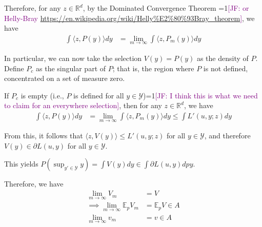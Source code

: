 \documentclass{article}
\newcommand{\Comments}{1}
\newcommand{\mynote}[2]{\ifnum\Comments=1\textcolor{#1}{#2}\fi}
\newcommand{\jessie}[1]{\mynote{purple}{[JF: #1]}}
\newcommand{\reals}{\mathbb{R}}
\newcommand{\E}{\mathbb{E}}
\newcommand{\Y}{\mathcal{Y}}
\newcommand{\inprod}[2]{\langle #1, #2 \rangle}%
\begin{document}
Therefore, for any $z \in \reals^d$, by the Dominated Convergence Theorem \jessie{or Helly-Bray \url{https://en.wikipedia.org/wiki/Helly\%E2\%80\%93Bray_theorem}}, we have 
\begin{align*}
\int \inprod{z}{P(y)} dy &= \lim_{m \to \infty} \int \inprod{z}{P_m(y)} dy
\end{align*}

In particular, we can now take the selection $V(y) = P(y)$ as the density of $P$.
Define $P_c$ as the singular part of $P$; that is, the region where $P$ is not defined, concentrated on a set of measure zero.

If $P_c$ is empty (i.e., $P$ is defined for all $y \in \Y$)\jessie{I think this is what we need to claim for an everywhere selection}, then for any $z \in \reals^d$, we have
\begin{align*}
\int \inprod{z}{P(y)} dy &= \lim_{m \to \infty} \int \inprod{z}{P_m(y)} dy \leq \int L'(u,y;z) dy
\end{align*}

From this, it follows that $\inprod{z}{V(y)} \leq L'(u,y;z)$ for all $y \in \Y$, and therefore $V(y) \in \partial L(u,y)$ for all $y \in \Y$.

This yields $P(\sup_{y' \in \Y} y) = \int V(y) dy \in \int \partial L(u,y) dpy$.

Therefore, we have 
\begin{align*}
\lim_{m\to \infty} V_m &= V \\
\implies \lim_{m \to \infty} \E_p V_m &= \E_p V \in A\\
\lim_{m \to \infty} v_m &= v \in A
\end{align*}



\end{document}
